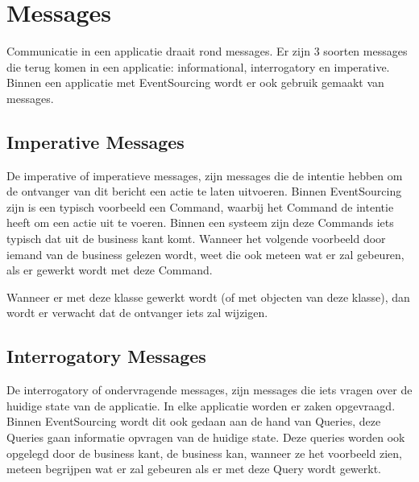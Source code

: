 
\section{Messages}
\label{sec:messages}

Communicatie in een applicatie draait rond messages. Er zijn 3 soorten messages die terug komen in een applicatie: informational, interrogatory en imperative. \textcite{Verraes2015Messages}
Binnen een applicatie met EventSourcing wordt er ook gebruik gemaakt van messages.


\subsection{Imperative Messages}
\label{subsec:imperative-messages}

De imperative of imperatieve messages, zijn messages die de intentie hebben om de ontvanger van dit bericht een actie te laten uitvoeren.
Binnen EventSourcing zijn is een typisch voorbeeld een Command, waarbij het Command de intentie heeft om een actie uit te voeren. Binnen een systeem zijn deze Commands iets typisch dat uit de business kant komt. Wanneer het volgende voorbeeld door iemand van de business gelezen wordt, weet die ook meteen wat er zal gebeuren, als er gewerkt wordt met deze Command.


Wanneer er met deze klasse gewerkt wordt (of met objecten van deze klasse), dan wordt er verwacht dat de ontvanger iets zal wijzigen.

\subsection{Interrogatory Messages}
\label{subsec:interrogatory-messages}

De interrogatory of ondervragende messages, zijn messages die iets vragen over de huidige state van de applicatie. In elke applicatie worden er zaken opgevraagd. Binnen EventSourcing wordt dit ook gedaan aan de hand van Queries, deze Queries gaan informatie opvragen van de huidige state. Deze queries worden ook opgelegd door de business kant, de business kan, wanneer ze het voorbeeld zien, meteen begrijpen wat er zal gebeuren als er met deze Query wordt gewerkt.

